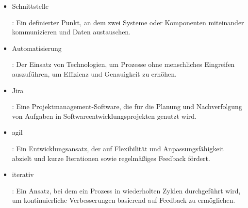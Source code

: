 \begin{itemize}
    \item \hypertarget{Schnittstelle}{Schnittstelle}: Ein definierter Punkt, an dem zwei Systeme oder Komponenten miteinander kommunizieren und Daten austauschen.
    \item \hypertarget{Automatisierung}{Automatisierung}: Der Einsatz von Technologien, um Prozesse ohne menschliches Eingreifen auszuführen, um Effizienz und Genauigkeit zu erhöhen.
    \item \hypertarget{Jira}{Jira}: Eine Projektmanagement-Software, die für die Planung und Nachverfolgung von Aufgaben in Softwareentwicklungsprojekten genutzt wird.
    \item \hypertarget{agil}{agil}: Ein Entwicklungsansatz, der auf Flexibilität und Anpassungsfähigkeit abzielt und kurze Iterationen sowie regelmäßiges Feedback fördert.
    \item \hypertarget{iterativ}{iterativ}: Ein Ansatz, bei dem ein Prozess in wiederholten Zyklen durchgeführt wird, um kontinuierliche Verbesserungen basierend auf Feedback zu ermöglichen.
\end{itemize}

